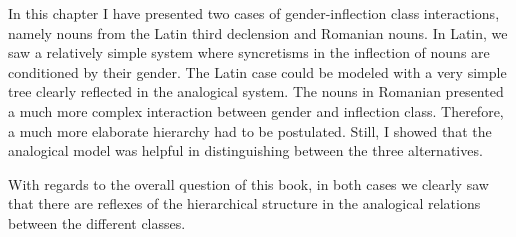 In this chapter I have presented two cases of gender-inflection class interactions, namely nouns from the Latin third declension and Romanian nouns. In Latin, we saw a relatively simple system where syncretisms in the inflection of nouns are conditioned by their gender. The Latin case could be modeled with a very simple tree clearly reflected in the analogical system. The nouns in Romanian presented a much more complex interaction between gender and inflection class. Therefore, a much more elaborate hierarchy had to be postulated. Still, I showed that the analogical model was helpful in distinguishing between the three alternatives.

With regards to the overall question of this book, in both cases we clearly saw that there are reflexes of the hierarchical structure in the analogical relations between the different classes.

